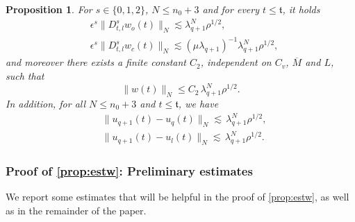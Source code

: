 \documentclass[10pt,a4paper]{amsart}
\numberwithin{equation}{section}
\numberwithin{corollario}{section}
\numberwithin{lemma}{section}
\newtheorem{prop}{Proposition}
\numberwithin{prop}{section}
\theoremstyle{definition}
\theoremstyle{remark}
\newcommand{\qq}{_{q+1}}
\begin{document}
\begin{prop}\label{prop:estw}
    For $s\in\{0,1,2\}$, $N\le n_0+3$ and for every $t\le \mathfrak{t}$, it holds
    \begin{align}  
        &\label{est:w0}\epsilon^{s}\|D_{t,l}^sw_o(t)\|_N\lesssim \lambda\qq^N \rho^{1/2},\\
        &\label{est:wC}\epsilon^{s}\|D_{t,l}^sw_c(t)\|_N\lesssim(\mu\lambda\qq)^{-1} \lambda\qq^N \rho^{1/2},
    \end{align}
    and moreover there exists a finite constant $C_2$, independent on $C_v$, $\overline{M}$ and $L$, such that
    \begin{equation}\label{e:wIndOnM}
        \|w(t)\|_N\le C_2\, \lambda\qq^{N}\rho^{1/2}.
    \end{equation}
In addition, for all $N\le n_0+3$ and $t \le\mathfrak{t}$, we have
    \begin{align}
        &\label{e:DiffU}\|u\qq(t)-u_q(t)\|_N\lesssim \,\lambda\qq^N\rho^{1/2},\\
        &\label{e:DiffUl}\|u\qq(t)-u_l(t)\|_N\lesssim \,\lambda\qq^N\rho^{1/2}.
    \end{align}
\end{prop}


\subsubsection{Proof of \autoref{prop:estw}: Preliminary estimates}
We report some estimates that will be helpful in the proof of \autoref{prop:estw}, as well as in the remainder of the paper.
\end{document}
